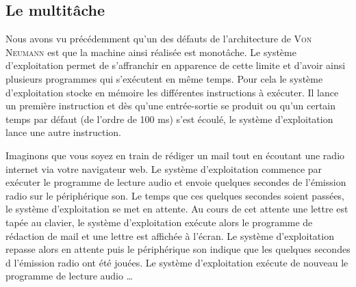 \subsection{Le multitâche}
Nous avons vu précédemment qu'un des défauts de l'architecture de \textsc{Von Neumann} est que la machine ainsi réalisée est monotâche. Le système d'exploitation permet de s'affranchir en apparence de cette limite et d'avoir ainsi plusieurs programmes qui s'exécutent en même temps. Pour cela le système d'exploitation stocke en mémoire les différentes instructions à exécuter. Il lance un première instruction et dès qu'une entrée-sortie se produit ou qu'un certain temps par défaut (de l'ordre de 100 ms) s'est écoulé, le système d'exploitation lance une autre instruction.\par
Imaginons que vous soyez en train de rédiger un mail tout en écoutant une radio internet via votre navigateur web.  Le système d'exploitation commence par exécuter le programme de lecture audio et envoie quelques secondes de l'émission radio sur le périphérique son. Le temps que ces quelques secondes soient passées, le système d'exploitation se met en attente. Au cours de cet attente une lettre est tapée au clavier, le système d'exploitation exécute alors le programme de rédaction de mail et une lettre est affichée à l'écran. Le système d'exploitation repasse alors en attente puis le périphérique son indique que les quelques secondes d l'émission radio ont été jouées. Le système d'exploitation exécute de nouveau le programme de lecture audio \dots
